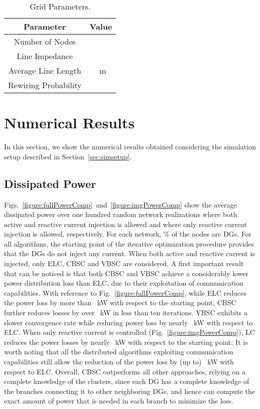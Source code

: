 \documentclass[journal]{IEEEtran}
\newcommand{\fig}[1]{Fig.~\ref{#1}}
\newcommand{\figs}[2]{Figs.~\ref{#1}~and~\ref{#2}}
\newcommand{\secref}[1]{Section~\ref{#1}}
\begin{document}
\begin{table}[ht]
\centering
\caption{Grid Parameters.}\label{table:varyingpars}
\begin{tabular}{|c|c|}
\hline
\textbf{Parameter}&\textbf{Value}\\
\hline
Number of Nodes &  \\
\hline
Line Impedance & \\
\hline
Average Line Length & ~m\\
\hline
Rewiring Probability & \\
\hline
\end{tabular}
\end{table}





\section{Numerical Results}
\label{sec:results}

In this section, we show the numerical results obtained considering the simulation setup described in \secref{sec:simsetup}.

\subsection{Dissipated Power}
\label{ssec:algoComparison}

\figs{figure:fullPowerComp}{figure:imgPowerComp} show the average dissipated power over one hundred random network realizations where both active and reactive current injection is allowed and where only reactive current injection is allowed, respectively. For each network, \% of the nodes are DGs. For all algorithms, the starting point of the iterative optimization procedure provides that the DGs do not inject any current. When both active and reactive current is injected, only ELC, CBSC and VBSC are considered. A first important result that can be noticed is that both CBSC and VBSC achieve a considerably lower power distribution loss than ELC, due to their exploitation of communication capabilities. With reference to \fig{figure:fullPowerComp}, while ELC reduces the power loss by more than ~kW with respect to the starting point, CBSC further reduces losses by over ~kW in less than ten iterations. VBSC exhibits a slower convergence rate while reducing power loss by nearly ~kW with respect to ELC. When only reactive current is controlled (\fig{figure:imgPowerComp}), LC reduces the power losses by nearly ~kW with respect to the starting point. It is worth noting that all the distributed algorithms exploiting communication capabilities still allow the reduction of the power loss by (up to) ~kW with respect to ELC. Overall, CBSC outperforms all other approaches, relying on a complete knowledge of the clusters, since each DG has a complete knowledge of the branches connecting it to other neighboring DGs, and hence can compute the exact amount of power that is needed in each branch to minimize the loss.
\end{document}

